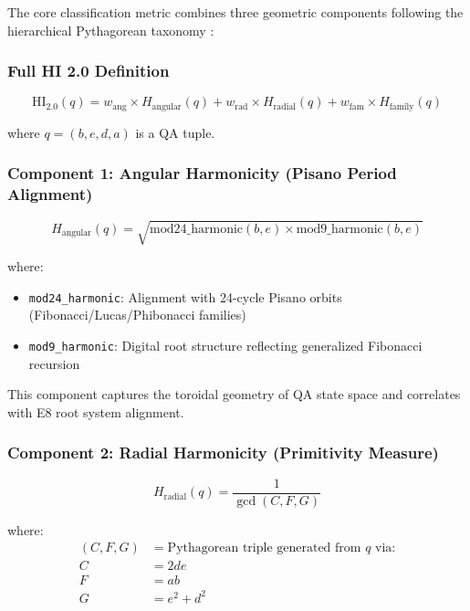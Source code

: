 \documentclass[11pt]{article}
\theoremstyle{remark}
\begin{document}
The core classification metric combines three geometric components following the hierarchical Pythagorean taxonomy \cite{pythagorean_families_2025}:

\subsubsection{Full HI 2.0 Definition}

\begin{equation}
\text{HI}_{2.0}(q) = w_{\text{ang}} \times H_{\text{angular}}(q) + w_{\text{rad}} \times H_{\text{radial}}(q) + w_{\text{fam}} \times H_{\text{family}}(q)
\end{equation}

where $q = (b, e, d, a)$ is a QA tuple.

\subsubsection{Component 1: Angular Harmonicity (Pisano Period Alignment)}

\begin{equation}
H_{\text{angular}}(q) = \sqrt{\text{mod24\_harmonic}(b,e) \times \text{mod9\_harmonic}(b,e)}
\end{equation}

where:
\begin{itemize}
\item \texttt{mod24\_harmonic}: Alignment with 24-cycle Pisano orbits (Fibonacci/Lucas/Phibonacci families)
\item \texttt{mod9\_harmonic}: Digital root structure reflecting generalized Fibonacci recursion
\end{itemize}

This component captures the toroidal geometry of QA state space and correlates with E8 root system alignment.

\subsubsection{Component 2: Radial Harmonicity (Primitivity Measure)}

\begin{equation}
H_{\text{radial}}(q) = \frac{1}{\gcd(C, F, G)}
\end{equation}

where:
\begin{align}
(C, F, G) &= \text{Pythagorean triple generated from } q \text{ via:} \\
C &= 2de \\
F &= ab \\
G &= e^2 + d^2
\end{align}
\end{document}
